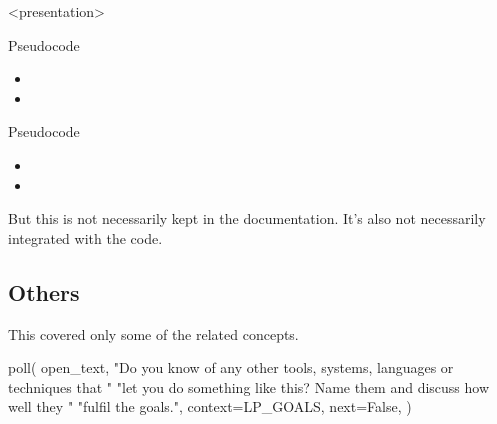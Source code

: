 \begin{frame}<presentation>
\begin{block}{Pseudocode}
  \begin{itemize}
    \item[\(+\)] {\color{green!75!black}\LPexplain}
    \item[\(+\)] {\color{green!75!black}\LPorder}
  \end{itemize}
\end{block}
\end{frame}

\begin{frame}
\begin{block}{Pseudocode}
  \begin{itemize}
    \item[\(\approx\)] {\color{orange}\LPexplain}
    \item[\(\approx\)] {\color{orange}\LPorder}
  \end{itemize}
\end{block}

\begin{remark}
  But this is not necessarily kept in the documentation.
  It's also not necessarily integrated with the code.
\end{remark}
\end{frame}


\subsection{Others}

This covered only some of the related concepts.

%
\begin{frame}[fragile]
\begin{activity}
\begin{pycode}
poll(
    open_text,
    "Do you know of any other tools, systems, languages or techniques that "
    "let you do something like this? Name them and discuss how well they "
    "fulfil the goals.",
    context=LP_GOALS,
    next=False,
)
\end{pycode}
\end{activity}
\end{frame}



